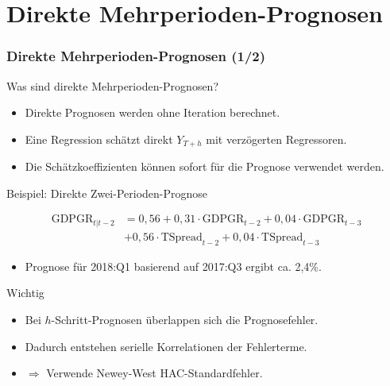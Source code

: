 \documentclass[10pt,aspectratio=169]{beamer}\usepackage[]{graphicx}\usepackage[]{xcolor}
\begin{document}
\section*{Direkte Mehrperioden-Prognosen}



\begin{frame}
  \frametitle{Direkte Mehrperioden-Prognosen \hfill (1/2)}

  Was sind direkte Mehrperioden-Prognosen?
  
  \begin{itemize}
    \item Direkte Prognosen werden ohne Iteration berechnet.
    \item Eine Regression schätzt direkt $Y_{T+h}$ mit verzögerten Regressoren.
    \item Die Schätzkoeffizienten können sofort für die Prognose verwendet werden.
  \end{itemize}  

  Beispiel: Direkte Zwei-Perioden-Prognose
  
  \vspace{-0.50cm}
  
  \begin{align*}
    \text{GDPGR}_{t|t-2} &= 0{,}56 + 0{,}31 \cdot \text{GDPGR}_{t-2} + 0{,}04 \cdot \text{GDPGR}_{t-3} \\
    &+ 0{,}56 \cdot \text{TSpread}_{t-2} + 0{,}04 \cdot \text{TSpread}_{t-3}
  \end{align*}

  \vspace{-0.25cm}

  \begin{itemize}
    \item Prognose für 2018:Q1 basierend auf 2017:Q3 ergibt ca. 2{,}4\%.
  \end{itemize}

  Wichtig
  
  \begin{itemize}
    \item Bei $h$-Schritt-Prognosen überlappen sich die Prognosefehler.
    \item Dadurch entstehen serielle Korrelationen der Fehlerterme.
    \item $\Rightarrow$ Verwende Newey-West HAC-Standardfehler.
  \end{itemize}  

\end{frame}
\end{document}
